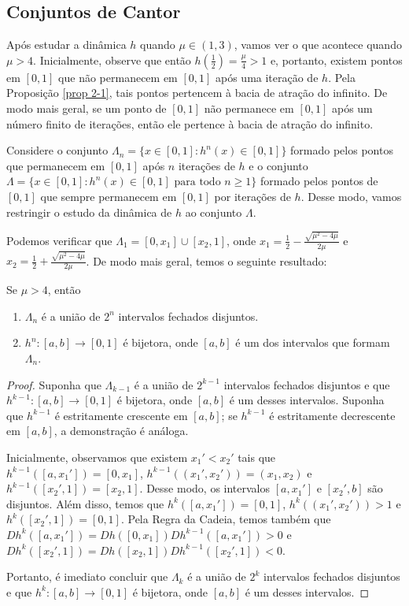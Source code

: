 \subsection{Conjuntos de Cantor}

Após estudar a dinâmica $h$ quando $\mu \in (1, 3)$, vamos ver o que acontece quando $\mu > 4$. Inicialmente, observe que  então $h(\frac{1}{2}) = \frac{\mu}{4} > 1$ e, portanto, existem pontos em $[0, 1]$ que não permanecem em $[0, 1]$ após uma iteração de $h$. Pela Proposição \ref{prop 2-1}, tais pontos pertencem à bacia de atração do infinito. De modo mais geral, se um ponto de $[0, 1]$ não permanece em $[0, 1]$ após um número finito de iterações, então ele pertence à bacia de atração do infinito.

Considere o conjunto $\Lambda_n = \lbrace x \in [0, 1] : h^n(x) \in [0, 1] \rbrace$ formado pelos pontos que permanecem em $[0, 1]$ após $n$ iterações de $h$ e o conjunto $\Lambda =  \lbrace x \in [0, 1] : h^n(x) \in [0, 1] \text{ para todo } n \geq 1 \rbrace$ formado pelos pontos de $[0, 1]$ que sempre permanecem em $[0, 1]$ por iterações de $h$. Desse modo, vamos restringir o estudo da dinâmica de $h$ ao conjunto $\Lambda$.

Podemos verificar que $\Lambda_1 = [0, x_1] \cup [x_2, 1]$, onde $x_1 = \frac{1}{2} - \frac{\sqrt{\mu^2 - 4\mu}}{2\mu}$ e $x_2 = \frac{1}{2} + \frac{\sqrt{\mu^2 - 4\mu}}{2\mu}$. De modo mais geral, temos o seguinte resultado:

\begin{proposition}
Se $\mu > 4$, então
\begin{enumerate}
\item $\Lambda_n$ é a união de $2^n$ intervalos fechados disjuntos.
\item $h^n: [a, b] \to [0, 1]$ é bijetora, onde $[a, b]$ é um dos intervalos que formam $\Lambda_n$.
\end{enumerate}
\end{proposition}

\begin{proof}
Suponha que $\Lambda_{k-1}$ é a união de $2^{k-1}$ intervalos fechados disjuntos e que $h^{k-1}: [a, b] \to [0, 1]$ é bijetora, onde $[a, b]$ é um desses intervalos.
Suponha que $h^{k-1}$ é estritamente crescente em $[a, b]$; se $h^{k-1}$ é estritamente decrescente em $[a, b]$, a demonstração é análoga.

Inicialmente, observamos que existem $x_1' < x_2'$ tais que $h^{k-1}([a, x_1']) = [0, x_1]$, $h^{k-1}((x_1', x_2')) = (x_1, x_2)$ e $h^{k-1}([x_2', 1]) = [x_2, 1]$.
Desse modo, os intervalos $[a, x_1']$ e $[x_2', b]$ são disjuntos.
Além disso, temos que $h^k([a, x_1']) = [0, 1]$, $h^k((x_1', x_2')) > 1$  e $h^k([x_2', 1]) = [0, 1]$.
Pela Regra da Cadeia, temos também que $D h^k([a, x_1']) = D h([0, x_1]) D h^{k-1}([a, x_1']) > 0$ e $D h^k([x_2', 1]) = D  h([x_2, 1]) D h^{k-1}([x_2', 1]) < 0$.

Portanto, é imediato concluir que $\Lambda_k$ é a união de $2^k$ intervalos fechados disjuntos e que $h^k: [a, b] \to [0, 1]$ é bijetora, onde $[a, b]$ é um desses intervalos.
\end{proof}

